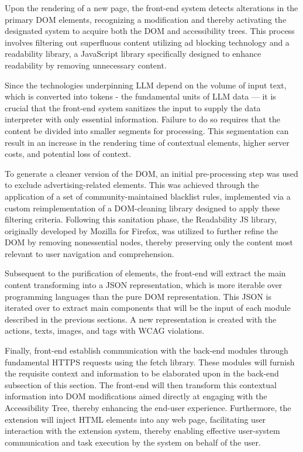 \documentclass[conference]{IEEEtran}
\begin{document}
Upon the rendering of a new page, the front-end system detects alterations in the primary DOM elements, recognizing a modification and thereby activating the designated system to acquire both the DOM and accessibility trees. This process involves filtering out superfluous content utilizing ad blocking technology and a readability library, a JavaScript library specifically designed to enhance readability by removing unnecessary content.

Since the technologies underpinning LLM depend on the volume of input text, which is converted into tokens - the fundamental units of LLM data — it is crucial that the front-end system sanitizes the input to supply the data interpreter with only essential information. Failure to do so requires that the content be divided into smaller segments for processing. This segmentation can result in an increase in the rendering time of contextual elements, higher server costs, and potential loss of context.

To generate a cleaner version of the DOM, an initial pre-processing step was used to exclude advertising-related elements. This was achieved through the application of a set of community-maintained blacklist rules, implemented via a custom reimplementation of a DOM-cleaning library designed to apply these filtering criteria. Following this sanitation phase, the Readability JS library, originally developed by Mozilla for Firefox, was utilized to further refine the DOM by removing nonessential nodes, thereby preserving only the content most relevant to user navigation and comprehension.

Subsequent to the purification of elements, the front-end will extract the main content transforming into a JSON representation, which is more iterable over programming languages than the pure DOM representation. This JSON is iterated over to extract main components that will be the input of each module described in the previous sections. A new representation is created with the actions, texts, images, and tags with WCAG violations.

Finally, front-end establish communication with the back-end modules through fundamental HTTPS requests using the fetch library. These modules will furnish the requisite context and information to be elaborated upon in the back-end subsection of this section. The front-end will then transform this contextual information into DOM modifications aimed directly at engaging with the Accessibility Tree, thereby enhancing the end-user experience. Furthermore, the extension will inject HTML elements into any web page, facilitating user interaction with the extension system, thereby enabling effective user-system communication and task execution by the system on behalf of the user.
\end{document}
